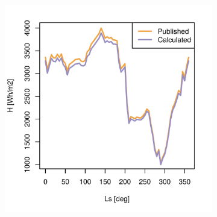 \begin{figure}[H]
\captionsetup[subfigure]{justification=centering}
\vspace{-2ex}
\centering
    \setlength{\subfigureWidth}{0.50\textwidth}
    \setlength{\graphicsHeight}{50mm}
    \hypersetup{hidelinks=true}%
    \begin{subfigure}[t]{\subfigureWidth}
        \centering
            \includegraphics[height=\graphicsHeight]{sections/appendix/insolation-calculation-verification/plots/h-exp-calc-at-vl1-with-beta-223-deg.png}
            \label{fig:sub:comparative-global-insolation-at-vl1-beta-equals-phi-daily-variations}
    \end{subfigure}\hfill
    \begin{subfigure}[t]{\subfigureWidth}
        \centering

\end{subfigure}
\end{figure}

